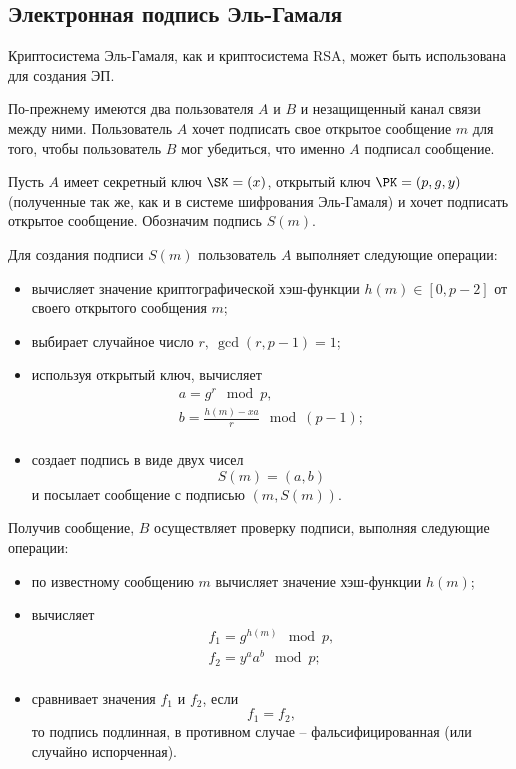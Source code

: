 \subsection[Электронная подпись]{Электронная подпись Эль-Гамаля}

Криптосистема Эль-Гамаля, как и криптосистема RSA, может быть использована для создания ЭП.

По-прежнему имеются два пользователя $A$ и $B$ и незащищенный канал связи между ними. Пользователь $A$  хочет подписать свое открытое сообщение $m$  для того, чтобы пользователь $B$ мог убедиться, что именно $A$ подписал сообщение.

Пусть $A$ имеет секретный ключ $\SK = (x)$, открытый ключ $\PK = (p,g,y)$ (полученные так же, как и в системе шифрования Эль-Гамаля) и хочет подписать открытое сообщение. Обозначим подпись $S(m)$.

Для создания подписи $S(m)$ пользователь $A$ выполняет следующие операции:
\begin{itemize}
    \item вычисляет значение криптографической хэш-функции  $h(m) \in [0,p-2]$ от своего открытого сообщения $m$;
    \item выбирает случайное число $r, ~ \gcd(r, p-1)=1$;
    \item используя открытый ключ, вычисляет
        \[ \begin{array}{l}
            a = g^r \mod p, \\
            b = \frac{h(m) - xa}{r} \mod (p-1); \\
        \end{array} \]
    \item создает подпись в виде двух чисел
        \[ S(m) = (a, b) \]
        и посылает сообщение с подписью $(m, S(m))$.
\end{itemize}

Получив сообщение, $B$ осуществляет проверку подписи, выполняя следующие операции:
\begin{itemize}
    \item по известному сообщению $m$ вычисляет значение хэш-функции $h(m)$;
    \item вычисляет
        \[ \begin{array}{l}
            f_1 = g^{h(m)} \mod p, \\
            f_2 = y^a a^b \mod p; \\
        \end{array} \]
    \item сравнивает значения $f_1$ и $f_2$, если
        \[ f_1 = f_2, \]
        то подпись подлинная, в противном случае -- фальсифицированная (или случайно испорченная).
\end{itemize}

